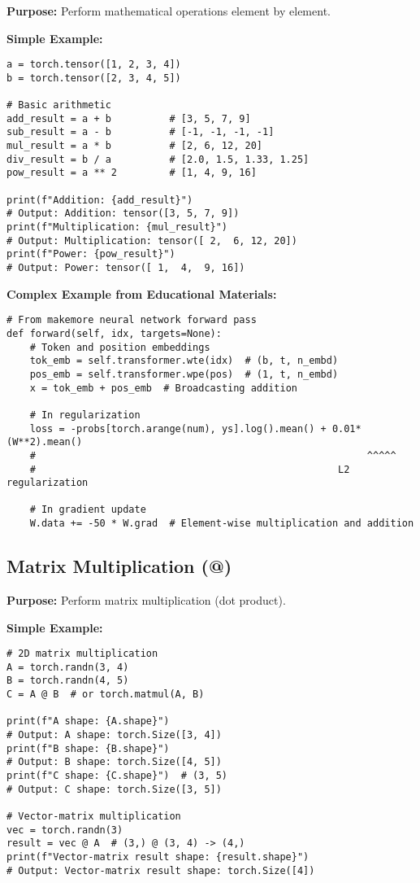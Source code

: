 \documentclass[11pt,a4paper]{book}
\begin{document}
\textbf{Purpose:} Perform mathematical operations element by element.

\textbf{Simple Example:}
\begin{verbatim}
a = torch.tensor([1, 2, 3, 4])
b = torch.tensor([2, 3, 4, 5])

# Basic arithmetic
add_result = a + b          # [3, 5, 7, 9]
sub_result = a - b          # [-1, -1, -1, -1]
mul_result = a * b          # [2, 6, 12, 20]
div_result = b / a          # [2.0, 1.5, 1.33, 1.25]
pow_result = a ** 2         # [1, 4, 9, 16]

print(f"Addition: {add_result}")
# Output: Addition: tensor([3, 5, 7, 9])
print(f"Multiplication: {mul_result}")
# Output: Multiplication: tensor([ 2,  6, 12, 20])
print(f"Power: {pow_result}")
# Output: Power: tensor([ 1,  4,  9, 16])
\end{verbatim}

\textbf{Complex Example from Educational Materials:}
\begin{verbatim}
# From makemore neural network forward pass
def forward(self, idx, targets=None):
    # Token and position embeddings
    tok_emb = self.transformer.wte(idx)  # (b, t, n_embd)
    pos_emb = self.transformer.wpe(pos)  # (1, t, n_embd)
    x = tok_emb + pos_emb  # Broadcasting addition
    
    # In regularization
    loss = -probs[torch.arange(num), ys].log().mean() + 0.01*(W**2).mean()
    #                                                         ^^^^^
    #                                                    L2 regularization
    
    # In gradient update
    W.data += -50 * W.grad  # Element-wise multiplication and addition
\end{verbatim}

\subsection{Matrix Multiplication (@)}

\textbf{Purpose:} Perform matrix multiplication (dot product).

\textbf{Simple Example:}
\begin{verbatim}
# 2D matrix multiplication
A = torch.randn(3, 4)
B = torch.randn(4, 5)
C = A @ B  # or torch.matmul(A, B)

print(f"A shape: {A.shape}")
# Output: A shape: torch.Size([3, 4])
print(f"B shape: {B.shape}")
# Output: B shape: torch.Size([4, 5])
print(f"C shape: {C.shape}")  # (3, 5)
# Output: C shape: torch.Size([3, 5])

# Vector-matrix multiplication
vec = torch.randn(3)
result = vec @ A  # (3,) @ (3, 4) -> (4,)
print(f"Vector-matrix result shape: {result.shape}")
# Output: Vector-matrix result shape: torch.Size([4])
\end{verbatim}
\end{document}
